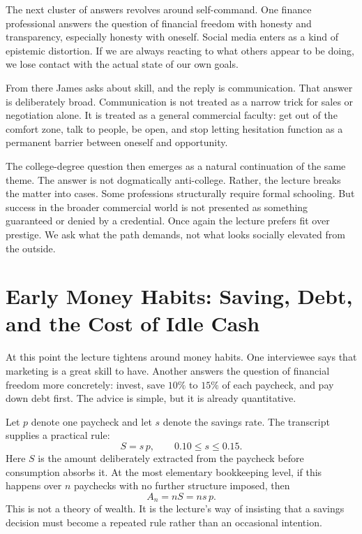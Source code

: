 The next cluster of answers revolves around self-command. One finance professional answers the question of financial freedom with honesty and transparency, especially honesty with oneself. Social media enters as a kind of epistemic distortion. If we are always reacting to what others appear to be doing, we lose contact with the actual state of our own goals.

From there James asks about skill, and the reply is communication. That answer is deliberately broad. Communication is not treated as a narrow trick for sales or negotiation alone. It is treated as a general commercial faculty: get out of the comfort zone, talk to people, be open, and stop letting hesitation function as a permanent barrier between oneself and opportunity.

The college-degree question then emerges as a natural continuation of the same theme. The answer is not dogmatically anti-college. Rather, the lecture breaks the matter into cases. Some professions structurally require formal schooling. But success in the broader commercial world is not presented as something guaranteed or denied by a credential. Once again the lecture prefers fit over prestige. We ask what the path demands, not what looks socially elevated from the outside.

\section{Early Money Habits: Saving, Debt, and the Cost of Idle Cash}

At this point the lecture tightens around money habits. One interviewee says that marketing is a great skill to have. Another answers the question of financial freedom more concretely: invest, save \(10\%\) to \(15\%\) of each paycheck, and pay down debt first. The advice is simple, but it is already quantitative.

Let \(p\) denote one paycheck and let \(s\) denote the savings rate. The transcript supplies a practical rule:
\begin{equation}
S = s\,p, \qquad 0.10 \le s \le 0.15.
\end{equation}
Here \(S\) is the amount deliberately extracted from the paycheck before consumption absorbs it. At the most elementary bookkeeping level, if this happens over \(n\) paychecks with no further structure imposed, then
\begin{equation}
A_n = nS = ns\,p.
\end{equation}
This is not a theory of wealth. It is the lecture's way of insisting that a savings decision must become a repeated rule rather than an occasional intention.

